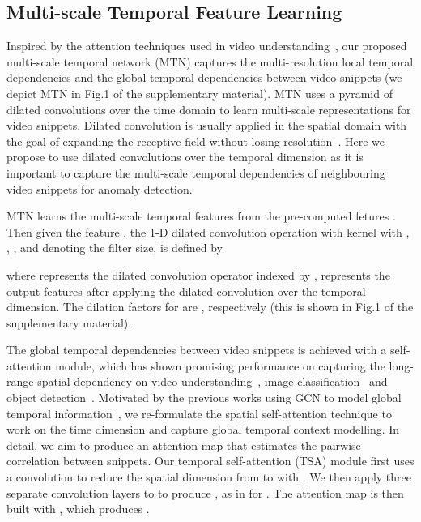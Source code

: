 \documentclass[10pt,twocolumn,letterpaper]{article}
\begin{document}
\subsection{Multi-scale Temporal Feature Learning}
\label{sec:temporal}
Inspired by the attention techniques used in video understanding~\cite{wang2018non,8451429}, our proposed multi-scale temporal network (MTN) captures the multi-resolution local temporal dependencies and the global temporal dependencies between video snippets (we depict MTN in Fig.1 of the supplementary material). MTN uses a pyramid of dilated convolutions over the time domain to learn multi-scale representations for video snippets. 
Dilated convolution is usually applied in the spatial domain with the goal of expanding the receptive field without losing resolution~\cite{yu2015multi}. Here we propose to use dilated convolutions over the temporal dimension as it is important to capture the multi-scale temporal dependencies of neighbouring video snippets for anomaly detection.




MTN learns the multi-scale temporal features from the pre-computed fetures
.
Then given the feature , the 1-D dilated convolution operation with kernel  with , , , and  denoting the filter size, is defined by

where  represents the dilated convolution operator indexed by ,
  represents the output features after applying the dilated convolution over the temporal dimension. 
The dilation factors for  are , respectively (this is shown in Fig.1 of the supplementary material).


The global temporal dependencies between video snippets is achieved with a self-attention module, which has shown promising performance on capturing the long-range spatial dependency on video understanding~\cite{wang2018non}, image classification~\cite{zhao2020exploring} and object detection~\cite{perreault2020spotnet}. 
Motivated by the previous works using GCN to model global temporal information~\cite{zhong2019graph,Wu2020not}, we re-formulate the spatial self-attention technique to work on the time dimension and capture global temporal context modelling. In detail, we aim to produce an attention map  that estimates the pairwise correlation between snippets. 
Our temporal self-attention (TSA) module first uses a  convolution to reduce the spatial dimension from  to  with . 
We then apply three separate  convolution layers to  to produce 
, as in
 for .
The attention map is then built with , which 
produces .
\end{document}
